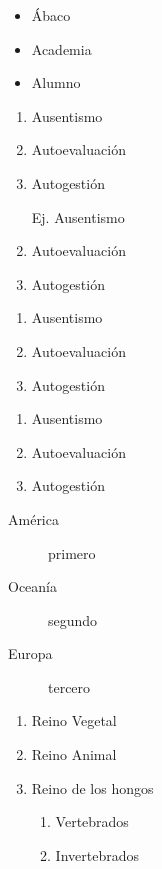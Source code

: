 \documentclass[•]{article}
\begin{document}
\begin{itemize}
\item Ábaco
\item Academia
\item Alumno
\end{itemize}
\begin{enumerate}
\item Ausentismo
\item Autoevaluación
\item Autogestión
\end{enumerate}
\begin{enumerate}
\item[Ej.] Ausentismo
\item Autoevaluación
\item Autogestión
\end{enumerate}
\begin{enumerate}[C{a}so 1]
\item Ausentismo
\item Autoevaluación
\item Autogestión
\end{enumerate}
\begin{enumerate}[\bfseries C{a}so 1]	%
\item Ausentismo
\item Autoevaluación
\item Autogestión
\end{enumerate}
\begin{description}
\item[América] primero
\item[Oceanía] segundo
\item[Europa] tercero
\end{description}
\begin{enumerate}
\item Reino Vegetal
\item Reino Animal
\item Reino de los hongos
\begin{enumerate}
\item Vertebrados
\item Invertebrados
\end{enumerate}
\end{enumerate}
\end{document}
